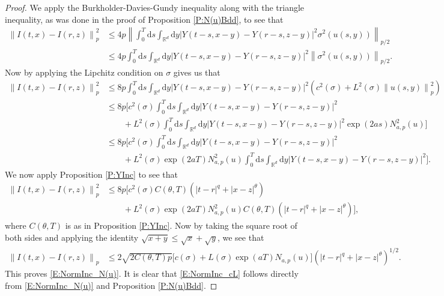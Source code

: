 \documentclass[a4paper,11pt]{article}
\numberwithin{equation}{section}
\theoremstyle{plain}
\theoremstyle{definition}
\newcommand{\ud}{\ensuremath{\mathrm{d} }}
\newcommand{\Norm}[1]{\left\|  #1   \right\|}
\newcommand{\R}{\mathbb{R}}
\numberwithin{NQ}{section}
\numberwithin{LQ}{section}
\numberwithin{ZQ}{section}
\begin{document}
	\begin{proof}
		We apply the Burkholder-Davies-Gundy inequality along with the triangle inequality, as was done in the proof of Proposition \ref{P:N(u)Bdd},  to see that
		\begin{align*}
		\Norm{I(t,x) - I(r,z)}_p^2 &\le 4p \Norm{ \int_0^T \ud s \int_{\R^d} \ud y \left| Y(t-s,x-y) - Y(r-s,z-y) \right|^2\sigma^2(u(s,y)) }_{p/2} \\
		&\le 4p \int_0^T \ud s \int_{\R^d} \ud y \left| Y(t-s,x-y) - Y(r-s,z-y) \right|^2  \Norm{\sigma^2(u(s,y)) }_{p/2}.
		\end{align*}
		Now by applying the Lipchitz condition on $\sigma$ gives us that
		\begin{align*}
		\Norm{I(t,x) - I(r,z)}_p^2 &\le 8p \int_0^T \ud s \int_{\R^d} \ud y \left| Y(t-s,x-y) - Y(r-s,z-y) \right|^2 \left( c^2(\sigma) + L^2(\sigma)\Norm{u(s,y)}_{p}^2\right) \\
		&\le 8p\Bigg[ c^2(\sigma)   \int_0^T \ud s \int_{\R^d} \ud y \left| Y(t-s,x-y) - Y(r-s,z-y) \right|^2 \\
		& \qquad+ L^2(\sigma) \int_0^T \ud s \int_{\R^d} \ud y \left| Y(t-s,x-y) - Y(r-s,z-y) \right|^2 \exp\left(2as\right)N_{a,p}^2(u)  \Bigg] \\
		&\le 8p\Bigg[ c^2(\sigma)   \int_0^T \ud s \int_{\R^d} \ud y \left| Y(t-s,x-y) - Y(r-s,z-y) \right|^2 \\
		& \qquad+ L^2(\sigma) \exp\left(2aT \right)N_{a,p}^2(u)  \int_0^T \ud s \int_{\R^d} \ud y \left| Y(t-s,x-y) - Y(r-s,z-y) \right|^2  \Bigg].
		\end{align*}
		We now apply Proposition \ref{P:YInc} to see that
		\begin{align*}
		\Norm{I(t,x) - I(r,z)}_p^2 &\le 8p \bigg[ c^2(\sigma)C(\theta, T)\left(|t-r|^{q} + |x-z|^{\theta}\right)\\
		& \qquad +  L^2(\sigma) \exp\left(2aT \right)N_{a,p}^2(u) C(\theta, T)\left(|t-r|^{q} + |x-z|^{\theta}\right) \bigg],
		\end{align*}
		where $C(\theta, T)$ is as in Proposition \ref{P:YInc}. Now by taking the square root of both sides and applying the identity $\sqrt{x+y} \le \sqrt{x} + \sqrt{y}$, we see that
		\begin{align*}
		\Norm{I(t,x) - I(r,z)}_p &\le 2\sqrt{2C(\theta, T)p} \Big[ c(\sigma) + L(\sigma) \exp\left(aT \right)N_{a,p}(u) \Big]\left(|t-r|^{q} + |x-z|^{\theta}\right)^{1/2}.
		\end{align*}
		This proves \eqref{E:NormInc_N(u)}. It is clear that \eqref{E:NormInc_cL} follows directly from \eqref{E:NormInc_N(u)} and Proposition \ref{P:N(u)Bdd}.
	\end{proof}
\end{document}
